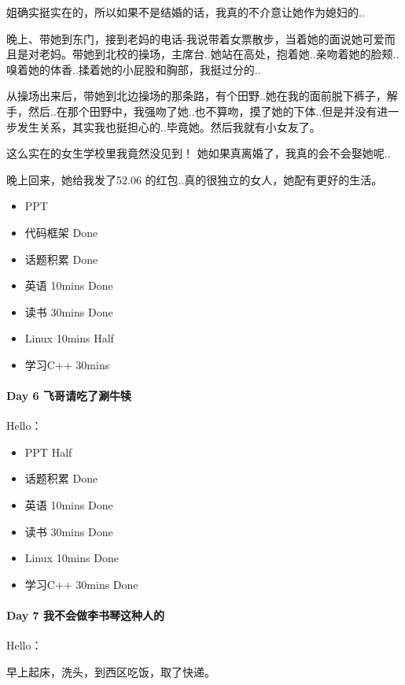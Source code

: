 \documentclass[UTF8,a4paper,8pt]{ctexbook}
\begin{document}
	 	 姐确实挺实在的，所以如果不是结婚的话，我真的不介意让她作为媳妇的..
	 	 
	 	 晚上、带她到东门，接到老妈的电话-我说带着女票散步，当着她的面说她可爱而且是对老妈。带她到北校的操场，主席台..她站在高处，抱着她..亲吻着她的脸颊..嗅着她的体香..揉着她的小屁股和胸部，我挺过分的..
	 	 
	 	 从操场出来后，带她到北边操场的那条路，有个田野..她在我的面前脱下裤子，解手，然后..在那个田野中，我强吻了她..也不算吻，摸了她的下体..但是并没有进一步发生关系，其实我也挺担心的..毕竟她。然后我就有小女友了。
	 	 
	 	 这么实在的女生学校里我竟然没见到！ 她如果真离婚了，我真的会不会娶她呢..
	 	 
	 	 晚上回来，她给我发了52.06 的红包..真的很独立的女人，她配有更好的生活。
	 	 
	 	 \begin{itemize}
	 	 	\item  PPT
	 	 	\item  代码框架 	Done
	 	 	\item  话题积累 	Done
	 	 	\item  英语 10mins 	Done
	 	 	\item  读书 30mins	Done
	 	 	\item  Linux 10mins	  Half
	 	 	\item  学习C++ 30mins  
	 	 \end{itemize}
 	 \paragraph{Day 6   飞哥请吃了涮牛犊    \quad     }Hello：
 	 
	 	 \begin{itemize}
	 	 	\item  PPT		Half
	 	 	\item  话题积累 	Done
	 	 	\item  英语 10mins 	Done
	 	 	\item  读书 30mins	Done
	 	 	\item  Linux 10mins	  Done
	 	 	\item  学习C++ 30mins  Done
	 	 \end{itemize}
 	 
 	 
 	 \paragraph{Day 7   我不会做李书琴这种人的    \quad     }Hello：
	 	 
	 	 早上起床，洗头，到西区吃饭，取了快递。
	 	 
\end{document}
